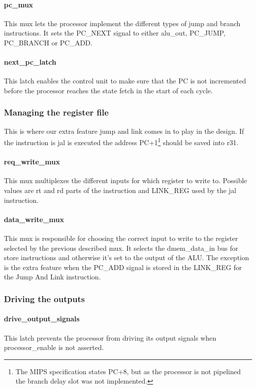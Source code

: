 \paragraph{pc\_mux} This mux lets the processor implement the different types of jump 
and branch instructions. It sets the PC\_NEXT signal to either alu\_out, PC\_JUMP, PC\_BRANCH or PC\_ADD. 

\paragraph{next\_pc\_latch} This latch enables the control unit to make sure that the PC 
is not incremented before the processor reaches the state fetch in the start of each cycle. 

\subsubsection{Managing the register file}

This is where our extra feature jump and link comes in to play in the design. If the instruction 
is jal is executed the address PC+1\footnote{The MIPS specification states PC+8, but as the processor 
is not pipelined the branch delay slot was not implemented.} should be saved into r31.

\paragraph{req\_write\_mux} This mux multiplexes the different inputs for which register to write to. 
Possible values are rt and rd parts of the instruction and LINK\_REG used by the jal instruction. 

\paragraph{data\_write\_mux} This mux is responsible for choosing the correct input to write to the 
register selected by the previous described mux. It selects the dmem\_data\_in bus for store instructions 
and otherwise it's set to the output of the ALU. The exception is the extra feature when the PC\_ADD signal 
is stored in the LINK\_REG for the Jump And Link instruction.

\subsubsection{Driving the outputs}

\paragraph{drive\_output\_signals} This latch prevents the processor from driving its 
output signals when processor\_enable is not asserted. 

